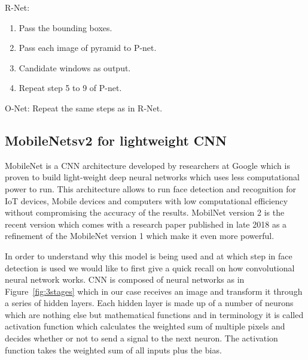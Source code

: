  R-Net:
\begin{enumerate}
  \vspace{-0.7cm} \item Pass the bounding boxes.
   \vspace{-0.3cm} \item Pass each image of pyramid to P-net.
  \vspace{-0.3cm} \item Candidate windows as output.
  \vspace{-0.3cm} \item Repeat step 5 to 9 of P-net.
\end{enumerate}


 O-Net: Repeat the same steps as in R-Net.

\subsection{MobileNetsv2 for lightweight CNN}

MobileNet is a CNN architecture developed by researchers at Google which is proven to build light-weight deep neural networks which uses less computational power to run. This architecture allows to run face detection and recognition for IoT devices, Mobile devices and computers with low computational efficiency without compromising the accuracy of the results. MobilNet version 2 is the recent version which comes with a research paper published in late 2018 as a refinement of the MobileNet version 1 which make it even more powerful. 

In order to understand why this model is being used and at which step in face detection is used we would like to first give a quick recall on how convolutional neural network works. CNN is composed of neural networks as in Figure~\ref{fig:3stages} which in our case receives an image  and transform it through a series of hidden layers. Each hidden layer is made up of a number of neurons which are nothing else but mathematical functions and in terminology it is called activation function which calculates the weighted sum of multiple pixels and decides whether or not to send a signal to the next neuron. The activation function takes the weighted sum of all inputs plus the bias.

